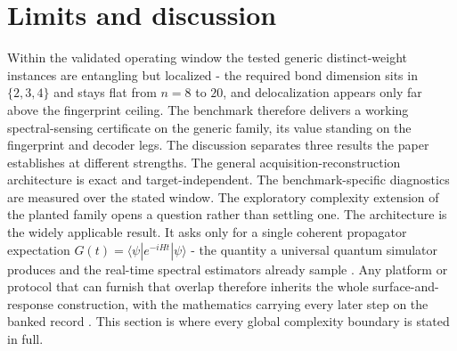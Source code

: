 \section{Limits and discussion}\label{sec:N7}

Within the validated operating window the tested generic distinct-weight instances are entangling but localized - the required bond dimension sits in $\{2, 3, 4\}$ and stays flat from $n = 8$ to $20$, and delocalization appears only far above the fingerprint ceiling. The benchmark therefore delivers a working spectral-sensing certificate on the generic family, its value standing on the fingerprint and decoder legs. The discussion separates three results the paper establishes at different strengths. The general acquisition-reconstruction architecture is exact and target-independent. The benchmark-specific diagnostics are measured over the stated window. The exploratory complexity extension of the planted family opens a question rather than settling one. The architecture is the widely applicable result. It asks only for a single coherent propagator expectation $G(t) = \langle\psi|e^{-iHt}|\psi\rangle$ - the quantity a universal quantum simulator produces \cite{lloyd1996universal, georgescu2014sim} and the real-time spectral estimators already sample \cite{somma2019eigenvalue, obrien2019qpe}. Any platform or protocol that can furnish that overlap therefore inherits the whole surface-and-response construction, with the mathematics carrying every later step on the banked record \cite{mccaul2025snacks, leamer2024emulation}. This section is where every global complexity boundary is stated in full.

